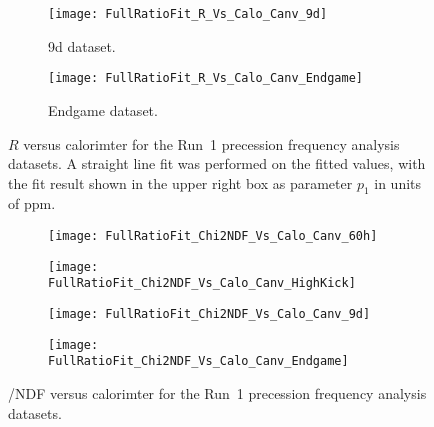 \begin{landscape}
\begin{figure}[]
\begin{minipage}[t]{0.48\linewidth}
    \begin{subfigure}[]{0.5\linewidth}
        \centering
        \texttt{[image: FullRatioFit\_R\_Vs\_Calo\_Canv\_9d]}
        \caption{9d dataset.}
    \end{subfigure}%
    \begin{subfigure}[]{0.5\linewidth}
        \centering
        \texttt{[image: FullRatioFit\_R\_Vs\_Calo\_Canv\_Endgame]}
        \caption{Endgame dataset.}
    \end{subfigure}
\captionsetup{width=0.9\linewidth}
\caption[$R$ versus calorimeter number]{$R$ versus calorimter for the Run~1 precession frequency analysis datasets. A straight line fit was performed on the fitted values, with the fit result shown in the upper right box as parameter $p_{1}$ in units of ppm.}
\label{fig:caloFits_R}
\end{minipage}
\end{figure}
\end{landscape}

\clearpage

\begin{figure}[]
\centering
    \begin{subfigure}[]{0.45\textwidth}
        \centering
        \texttt{[image: FullRatioFit\_Chi2NDF\_Vs\_Calo\_Canv\_60h]}
    \vspace{-10mm}
    \end{subfigure}%
    \begin{subfigure}[]{0.45\textwidth}
        \centering
        \texttt{[image: FullRatioFit\_Chi2NDF\_Vs\_Calo\_Canv\_HighKick]}
    \vspace{-10mm}
    \end{subfigure}

    \begin{subfigure}[]{0.45\textwidth}
        \centering
        \texttt{[image: FullRatioFit\_Chi2NDF\_Vs\_Calo\_Canv\_9d]}
    \vspace{-10mm}
    \end{subfigure}%
    \begin{subfigure}[]{0.45\textwidth}
        \centering
        \texttt{[image: FullRatioFit\_Chi2NDF\_Vs\_Calo\_Canv\_Endgame]}
    \vspace{-10mm}
    \end{subfigure}
\caption[\chisq/NDF versus calorimeter number]{\chisq/NDF versus calorimter for the Run~1 precession frequency analysis datasets.}
\label{fig:caloFits_chi2}
\end{figure}

